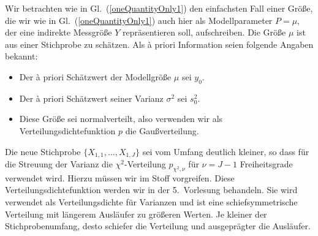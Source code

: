 Wir betrachten wie in Gl.~(\ref{oneQuantityOnly1}) den einfachsten Fall einer Größe,
die wir wie in Gl.~(\ref{oneQuantityOnly1}) auch hier als Modellparameter $P = \mu$, der
eine indirekte Messgröße $Y$ repräsentieren soll, aufschreiben.
Die Größe $\mu$ ist aus einer Stichprobe zu schätzen.
Als {\`a} priori Information seien folgende Angaben bekannt:
\begin{itemize}
\item Der {\`a} priori Schätzwert der Modellgröße $\mu$ sei $y_0$.
\item Der {\`a} priori Schätzwert seiner Varianz $\sigma^2$ sei $s^2_0$.
\item Diese Größe sei normalverteilt, also verwenden wir als
Verteilungsdichtefunktion $p$ die Gaußverteilung.
\end{itemize}
Die neue Stichprobe $\{X_{1,1}, \dots, X_{1,J}\}$ sei vom Umfang deutlich kleiner, so dass
für die Streuung der Varianz die $\chi^2$-Verteilung $p_{\chi^2,\nu}$
für $\nu = J-1$ Freiheitsgrade verwendet wird. Hierzu müssen wir im Stoff vorgreifen.
Diese Verteilungsdichtefunktion werden wir in der 5.\ Vorlesung behandeln.
Sie wird verwendet als Verteilungsdichte für Varianzen und ist eine schiefsymmetrische
Verteilung mit längerem Ausläufer zu größeren Werten. Je kleiner der Stichprobenumfang,
desto schiefer die Verteilung und ausgeprägter die Ausläufer.

